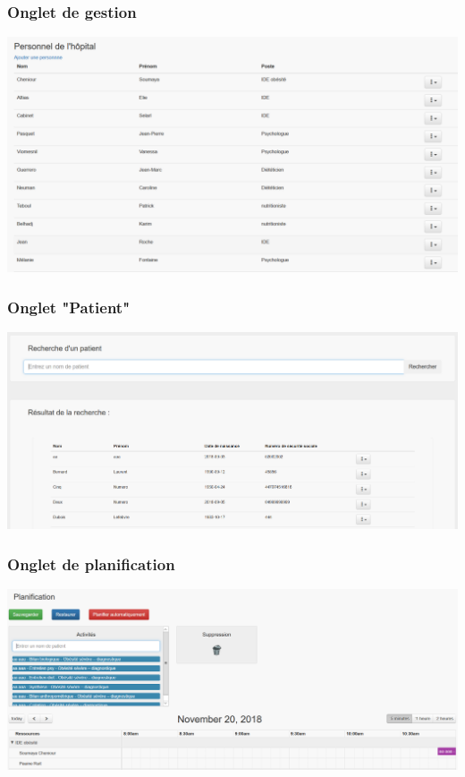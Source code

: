 \documentclass{beamer}
\begin{document}
\begin{frame}
\frametitle{Onglet de gestion}
	
\begin{center}
	\includegraphics[scale=0.35]{images/affichage_personnel}
\end{center}
	
\end{frame}

\begin{frame}
\frametitle{Onglet "Patient"}

\begin{center}
	\includegraphics[scale=0.28]{images/recherchePatient}
\end{center}

\end{frame}

\begin{frame}
\frametitle{Onglet de planification}

\begin{center}
	\includegraphics[scale=0.3]{images/bouton_plan_auto}
\end{center}

\end{frame}
\end{document}
